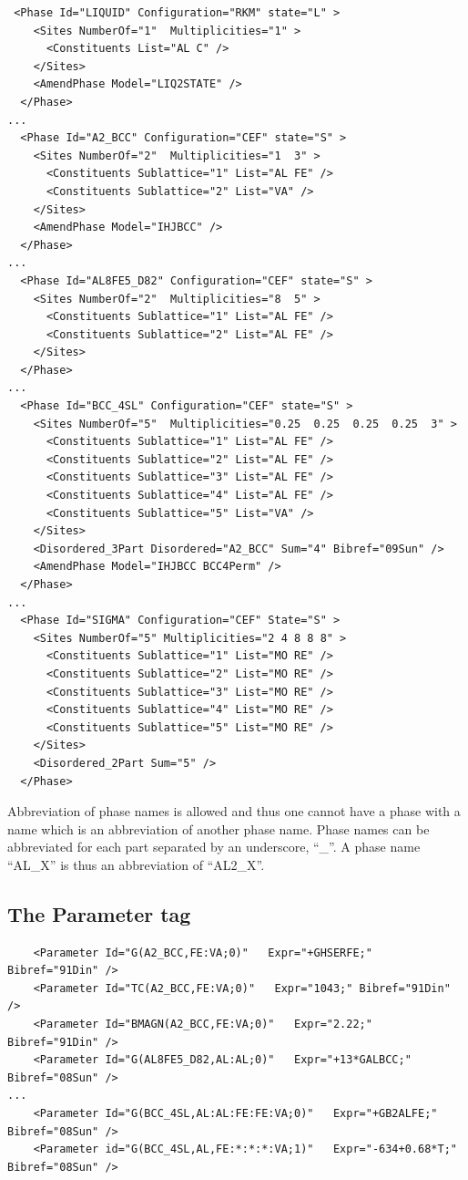 \documentclass{article}
\begin{document}
\begin{appendices}
{\small
\begin{verbatim}
 <Phase Id="LIQUID" Configuration="RKM" state="L" >
    <Sites NumberOf="1"  Multiplicities="1" >
      <Constituents List="AL C" />
    </Sites>
    <AmendPhase Model="LIQ2STATE" />
  </Phase>
...
  <Phase Id="A2_BCC" Configuration="CEF" state="S" >
    <Sites NumberOf="2"  Multiplicities="1  3" >
      <Constituents Sublattice="1" List="AL FE" />
      <Constituents Sublattice="2" List="VA" />
    </Sites>
    <AmendPhase Model="IHJBCC" />
  </Phase>
...
  <Phase Id="AL8FE5_D82" Configuration="CEF" state="S" >
    <Sites NumberOf="2"  Multiplicities="8  5" >
      <Constituents Sublattice="1" List="AL FE" />
      <Constituents Sublattice="2" List="AL FE" />
    </Sites>
  </Phase>
...
  <Phase Id="BCC_4SL" Configuration="CEF" state="S" >
    <Sites NumberOf="5"  Multiplicities="0.25  0.25  0.25  0.25  3" >
      <Constituents Sublattice="1" List="AL FE" />
      <Constituents Sublattice="2" List="AL FE" />
      <Constituents Sublattice="3" List="AL FE" />
      <Constituents Sublattice="4" List="AL FE" />
      <Constituents Sublattice="5" List="VA" />
    </Sites>
    <Disordered_3Part Disordered="A2_BCC" Sum="4" Bibref="09Sun" />
    <AmendPhase Model="IHJBCC BCC4Perm" />
  </Phase>
...
  <Phase Id="SIGMA" Configuration="CEF" State="S" >
    <Sites NumberOf="5" Multiplicities="2 4 8 8 8" >
      <Constituents Sublattice="1" List="MO RE" />
      <Constituents Sublattice="2" List="MO RE" />
      <Constituents Sublattice="3" List="MO RE" />
      <Constituents Sublattice="4" List="MO RE" />
      <Constituents Sublattice="5" List="MO RE" />
    </Sites>
    <Disordered_2Part Sum="5" />
  </Phase>
\end{verbatim}
}

Abbreviation of phase names is allowed and thus one cannot have a phase
with a name which is an abbreviation of another phase name.  Phase
names can be abbreviated for each part separated by an underscore,
``\_''.  A phase name ``AL\_X'' is thus an abbreviation of ``AL2\_X''.

\subsection{The Parameter tag}\label{sec:parameter examples}

{\small
\begin{verbatim}
    <Parameter Id="G(A2_BCC,FE:VA;0)"   Expr="+GHSERFE;" Bibref="91Din" />
    <Parameter Id="TC(A2_BCC,FE:VA;0)"   Expr="1043;" Bibref="91Din" />
    <Parameter Id="BMAGN(A2_BCC,FE:VA;0)"   Expr="2.22;" Bibref="91Din" />
    <Parameter Id="G(AL8FE5_D82,AL:AL;0)"   Expr="+13*GALBCC;" Bibref="08Sun" />
...
    <Parameter Id="G(BCC_4SL,AL:AL:FE:FE:VA;0)"   Expr="+GB2ALFE;" Bibref="08Sun" />
    <Parameter id="G(BCC_4SL,AL,FE:*:*:*:VA;1)"   Expr="-634+0.68*T;" Bibref="08Sun" />
\end{verbatim}
}


\end{appendices}
\end{document}
